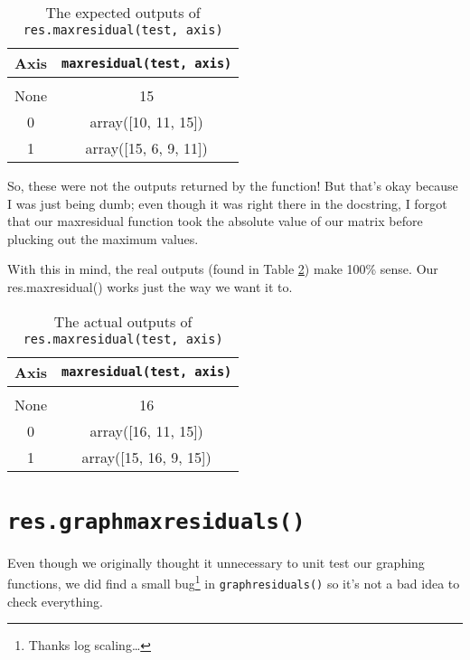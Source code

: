 \documentclass{article}
\begin{document}
\begin{table}
  \centering
  \begin{tabular}[c]{c|c}
    \hline\hline
    Axis & \verb|maxresidual(test, axis)| \\
    \hline \\ [-1.5ex]
    None & 15 \\ [1ex]
    0 & array([10, 11, 15]) \\ [1ex]
    1 & array([15, 6, 9, 11]) \\ [1ex]
    \hline
  \end{tabular}
  \caption{The expected outputs of \texttt{res.maxresidual(test,
      axis)}}
\label{tab:axes}
\end{table}

So, these were not the outputs returned by the function!  But that's
okay because I was just being dumb; even though it was right there in
the docstring, I forgot that our maxresidual function took the
absolute value of our matrix before plucking out the maximum values.

With this in mind, the real outputs (found in Table \ref{tab:axes2}) make 100\% sense.  Our res.maxresidual()
works just the way we want it to.

\begin{table}
  \centering
  \begin{tabular}[c]{c|c}
    \hline\hline
    Axis & \verb|maxresidual(test, axis)| \\
    \hline \\ [-1.5ex]
    None & 16 \\ [1ex]
    0 & array([16, 11, 15]) \\ [1ex]
    1 & array([15, 16, 9, 15]) \\ [1ex]
    \hline
  \end{tabular}
  \caption{The actual outputs of \texttt{res.maxresidual(test,
      axis)}}
\label{tab:axes2}
\end{table}


\section{\texttt{res.graphmaxresiduals()}}
\label{sec:graphmaxresiduals}

Even though we originally thought it unnecessary to unit test our
graphing functions, we did find a small bug\footnote{Thanks log
  scaling\ldots} in \verb|graphresiduals()| so it's not a bad idea to
check everything.
\end{document}
